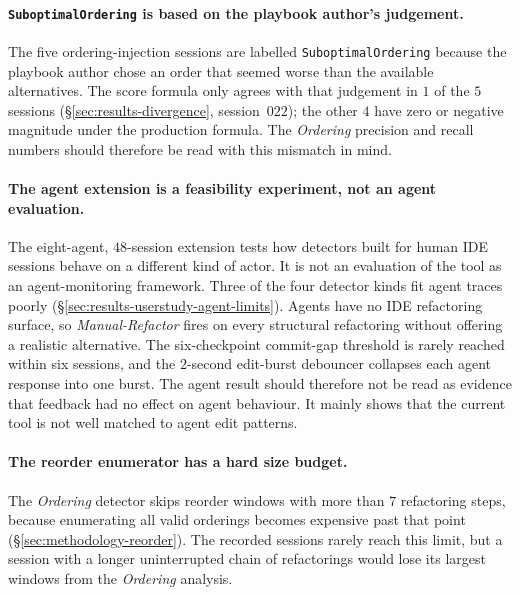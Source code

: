 \paragraph{\texttt{SuboptimalOrdering} is based on the playbook author's judgement.}
The five ordering-injection sessions are labelled \texttt{SuboptimalOrdering} because the playbook author chose an order that seemed worse than the available alternatives. The score formula only agrees with that judgement in $1$ of the $5$ sessions (\S\ref{sec:results-divergence}, session~$022$); the other $4$ have zero or negative magnitude under the production formula. The \emph{Ordering} precision and recall numbers should therefore be read with this mismatch in mind.

\paragraph{The agent extension is a feasibility experiment, not an agent evaluation.}
The eight-agent, $48$-session extension tests how detectors built for human IDE sessions behave on a different kind of actor. It is not an evaluation of the tool as an agent-monitoring framework. Three of the four detector kinds fit agent traces poorly (\S\ref{sec:results-userstudy-agent-limits}). Agents have no IDE refactoring surface, so \emph{Manual-Refactor} fires on every structural refactoring without offering a realistic alternative. The six-checkpoint commit-gap threshold is rarely reached within six sessions, and the $2$-second edit-burst debouncer collapses each agent response into one burst. The agent result should therefore not be read as evidence that feedback had no effect on agent behaviour. It mainly shows that the current tool is not well matched to agent edit patterns.

\paragraph{The reorder enumerator has a hard size budget.}
The \emph{Ordering} detector skips reorder windows with more than $7$ refactoring steps, because enumerating all valid orderings becomes expensive past that point (\S\ref{sec:methodology-reorder}). The recorded sessions rarely reach this limit, but a session with a longer uninterrupted chain of refactorings would lose its largest windows from the \emph{Ordering} analysis.

\label{sec:threats-internal}
\label{sec:threats-statistical}
\label{sec:threats-per-experiment}
\label{sec:threats-implementation}
\label{sec:threats-out-of-scope}

